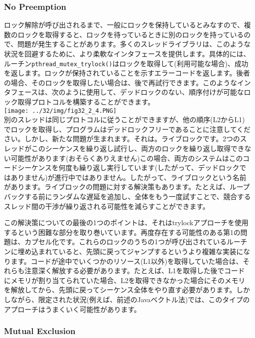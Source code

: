 \hypertarget{no-preemption}{%
\subsubsection*{No Preemption}\label{no-preemption}}

ロック解除が呼び出されるまで、一般にロックを保持しているとみなすので、複数のロックを取得すると、ロックを待っているときに別のロックを持っているので、問題が発生することがあります。多くのスレッドライブラリは、このような状況を回避するために、より柔軟なインタフェースを提供します。具体的には、ルーチン\texttt{pthread\_mutex\_trylock()}はロックを取得して(利用可能な場合)、成功を返します。ロックが保持されていることを示すエラーコードを返します。後者の場合、そのロックを取得したい場合は、後で再試行できます。このようなインタフェースは、次のように使用して、デッドロックのない、順序付けが可能なロック取得プロトコルを構築することができます。\\
\texttt{[image: ../32/img/fig32\_2\_4.PNG]}\\
別のスレッドは同じプロトコルに従うことができますが、他の順序(L2からL1)でロックを取得し、プログラムはデッドロックフリーであることに注意してください。しかし、新たな問題が生まれます。それは。ライブロックです。2つのスレッドがこのシーケンスを繰り返し試行し、両方のロックを繰り返し取得できない可能性があります(おそらくありえません)この場合、両方のシステムはこのコードシーケンスを何度も繰り返し実行しています(したがって、デッドロックではありません)が進行中ではありません。したがって、ライブロックという名前があります。ライブロックの問題に対する解決策もあります。たとえば、ループバックする前にランダムな遅延を追加し、全体をもう一度試すことで、競合するスレッド間の干渉が繰り返される可能性を減らすことができます。

この解決策についての最後の1つのポイントは、それはtrylockアプローチを使用するという困難な部分を取り巻いています。再度存在する可能性のある第1の問題は、カプセル化です。これらのロックのうちの1つが呼び出されているルーチンに埋め込まれていると、先頭に戻ってジャンプするというより複雑な実装になります。コードが途中でいくつかのリソース(L1以外)を取得していた場合は、それらも注意深く解放する必要があります。たとえば、L1を取得した後でコードにメモリが割り当てられていた場合、L2を取得できなかった場合にそのメモリを解放してから、先頭に戻ってシーケンス全体をやり直す必要があります。しかしながら、限定された状況(例えば、前述のJavaベクトル法)では、このタイプのアプローチはうまくいく可能性があります。

\hypertarget{mutual-exclusion}{%
\subsubsection*{Mutual Exclusion}\label{mutual-exclusion}}

